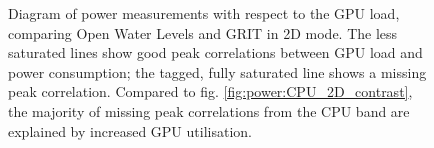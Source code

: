 \documentclass[review]{elsarticle}
\begin{document}
\begin{figure}[htbp!]
\begin{center}
	 	\begin{minipage}{\columnwidth}
	 		\centering
	 	\end{minipage}
	 	\begin{minipage}{\columnwidth}
	 		\centering
	 	\end{minipage}
	\caption{Diagram of power measurements with respect to the GPU load, comparing Open Water Levels and GRIT in 2D mode. The less saturated lines show good peak correlations between GPU load and power consumption; the tagged, fully saturated line shows a missing peak correlation. Compared to fig. \ref{fig:power:CPU_2D_contrast}, the majority of missing peak correlations from the CPU band are explained by increased GPU utilisation.}
	\label{fig:power:GPU_2D_contrast}
\end{center}
\end{figure}
\end{document}
